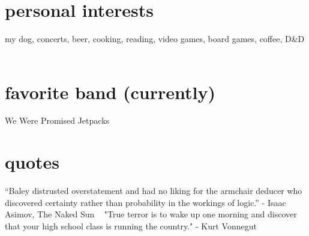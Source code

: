 
\begin{aside} %
\section{personal interests}
my dog, concerts, beer, cooking, reading, video games, board games, coffee, D\&D
~
\section{favorite band (currently)}
We Were Promised Jetpacks
~
\section{quotes}
“Baley distrusted overstatement and had no liking for the armchair deducer who discovered certainty rather than probability in the workings of logic.”
- Isaac Asimov, The Naked Sun
~
"True terror is to wake up one morning and discover that your high school class is running the country."
- Kurt Vonnegut
\end{aside}
